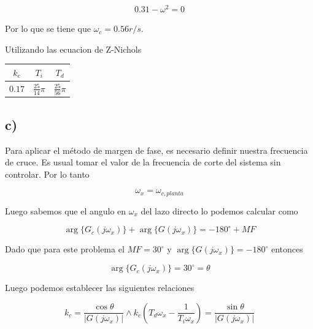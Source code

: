 \documentclass{article}
\begin{document}
    \begin{eqnarray}
        0.31 - \omega^2 = 0
    \end{eqnarray}

    Por lo que se tiene que $\omega_c=0.56 r/s$.

    Utilizando las ecuacion de Z-Nichols 

    \begin{table}[!htb]
        \centering
        \begin{tabular}{|c|c|c|}
            \hline $k_c$ & $T_i$ & $T_d$ \\
            \hline $0.17$ & $\frac{25}{14} \pi$ & $\frac{25}{56} \pi$ \\
            \hline
        \end{tabular}
    \end{table}


        \subsection{c)}

        Para aplicar el método de margen de fase, es necesario definir nuestra frecuencia de cruce. Es usual tomar el 
        valor de la frecuencia de corte del sistema sin controlar. Por lo tanto 

        \begin{equation}
            \omega_{x} = \omega_{c, planta}
        \end{equation}

        Luego sabemos que el angulo en $\omega_x$ del lazo directo lo podemos calcular como 

        \begin{equation}
            \arg\{ G_c(j\omega_x)  \} + \arg\{ G( j\omega_x )  \} = -180^\circ + MF
        \end{equation}

        Dado que para este problema el $MF=30^\circ$ y $\arg\{ G( j\omega_x )  \}=-180^\circ$ entonces

        \begin{equation}
            \arg\{ G_c(j\omega_x)  \} = 30^\circ = \theta
        \end{equation}

        Luego podemos establecer las siguientes relaciones 

        \begin{equation}
            k_c = \frac{\cos \theta}{ | G(j\omega_x) | } \land k_c\left( T_d \omega_x - \frac{1}{T_i \omega_x} \right) = \frac{\sin \theta}{| G(j\omega_x) |}
        \end{equation}
\end{document}
